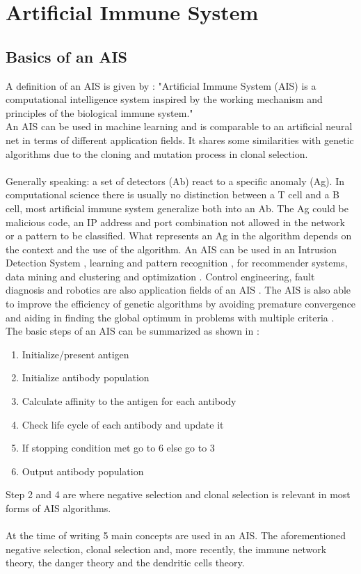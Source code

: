 \chapter{Artificial Immune System}
\label{chap:ais}
\section{Basics of an AIS}
A definition of an AIS is given by \cite[p. 5]{tan2016artificial}:
"Artificial Immune System (AIS) is a computational intelligence system inspired by the working mechanism and principles of the biological immune system."\\An AIS can be used in machine learning and is comparable to an artificial neural net in terms of different application fields.
It shares some similarities with genetic algorithms due to the cloning and mutation process in clonal selection.\\\\
Generally speaking: a set of detectors (Ab) react to a specific anomaly (Ag). In computational science there is usually no distinction between a T cell and a B cell, most artificial immune system generalize both into an Ab. The Ag could be malicious code, an IP address and port combination not allowed in the network or a pattern to be classified. What represents an Ag in the algorithm depends on the context and the use of the algorithm. An AIS can be used in an Intrusion Detection System \cite{PAM17}, learning and pattern recognition \cite{DEC02}, for recommender systems, data mining and clustering \cite{burke2013} and optimization \cite{NAN08}. Control engineering, fault diagnosis and robotics are also application fields of an AIS \cite{tan2016artificial}. The AIS is also able to improve the efficiency of genetic algorithms by avoiding premature convergence and aiding in finding the global optimum in problems with multiple criteria \cite[p. 21]{tan2016artificial}.\\

The basic steps of an AIS can be summarized as shown in \cite{tan2016artificial}:
\begin{enumerate}
	\item 	Initialize/present antigen
	\item 	Initialize antibody population
	\item 	Calculate affinity to the antigen for each antibody
	\item 	Check life cycle of each antibody and update it
	\item 	If stopping condition met go to 6 else go to 3
	\item 	Output antibody population
\end{enumerate}
Step 2 and 4 are where negative selection and clonal selection is relevant in most forms of AIS algorithms.\\\\
At the time of writing 5 main concepts are used in an AIS. The aforementioned negative selection, clonal selection and, more recently, the immune network theory, the danger theory and the dendritic cells theory. 

